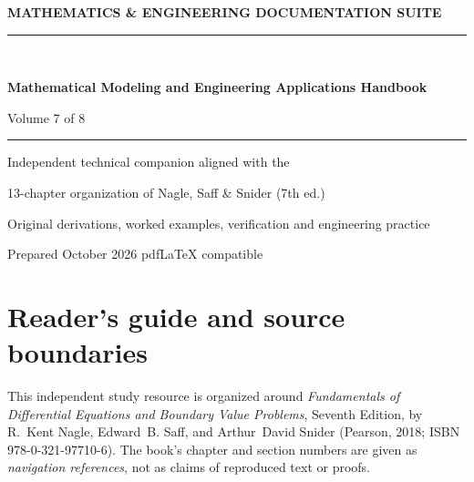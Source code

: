 \documentclass[11pt,letterpaper,oneside]{report}
\theoremstyle{definition}\newtheorem{definition}[theorem]{Definition}
\theoremstyle{remark}\newtheorem{remark}[theorem]{Remark}
\begin{document}
\hypersetup{pageanchor=false}%
\begin{titlepage}
\pagecolor{navy}\color{white}
\vspace*{0.75in}
{\sffamily\bfseries\large MATHEMATICS \& ENGINEERING DOCUMENTATION SUITE\\[12pt]}
{\color{cyan!40}\rule{\textwidth}{2pt}}\\[1.0in]
{\sffamily\bfseries\fontsize{29}{36}\selectfont Mathematical Modeling and Engineering Applications Handbook\par}
\vspace{0.45in}
{\Large Volume 7 of 8}\par\vspace{0.55in}
{\color{cyan!30}\rule{0.50\textwidth}{1pt}}\par\vspace{0.3in}
{\large Independent technical companion aligned with the\par}
{\large 13-chapter organization of Nagle, Saff \& Snider (7th ed.)\par}
\vfill
{\large Original derivations, worked examples, verification and engineering practice\par}\vspace{0.3in}
{\small Prepared October 2026 \quad\textbullet\quad pdf\LaTeX{} compatible\par}
\end{titlepage}\hypersetup{pageanchor=true}
\nopagecolor\color{ink}
\chapter*{Reader's guide and source boundaries}
This independent study resource is organized around \emph{Fundamentals of Differential Equations and Boundary Value Problems}, Seventh Edition, by R.~Kent Nagle, Edward~B. Saff, and Arthur~David Snider (Pearson, 2018; ISBN 978-0-321-97710-6). The book's chapter and section numbers are given as \emph{navigation references}, not as claims of reproduced text or proofs.
\end{document}
